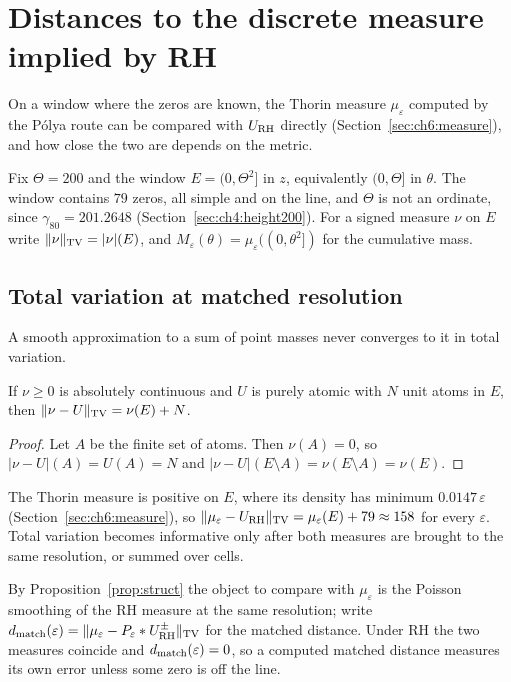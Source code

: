 \section{Distances to the discrete measure implied by RH}\label{ch:distances}

On a window where the zeros are known, the Thorin measure $\mu_\varepsilon$ computed by the P\'olya route can be compared with $U_{\mathrm{RH}}$ directly (Section~\ref{sec:ch6:measure}), and how close the two are depends on the metric.

Fix $\Theta=200$ and the window $E=(0,\Theta^2]$ in $z$, equivalently $(0,\Theta]$ in $\theta$. The window contains $79$ zeros, all simple and on the line, and $\Theta$ is not an ordinate, since $\gamma_{80}=201.2648$ (Section~\ref{sec:ch4:height200}). For a signed measure $\nu$ on $E$ write $\lVert \nu\rVert_{\mathrm{TV}}=|\nu|(E)$, and $M_\varepsilon(\theta)=\mu_\varepsilon((0,\theta^2])$ for the cumulative mass.

\subsection{Total variation at matched resolution}\label{sec:ch7:matched}

A smooth approximation to a sum of point masses never converges to it in total variation.

\begin{proposition}\label{prop:raw}
If $\nu\ge0$ is absolutely continuous and $U$ is purely atomic with $N$ unit atoms in $E$, then $\lVert \nu-U\rVert_{\mathrm{TV}}=\nu(E)+N$.
\end{proposition}

\begin{proof}
Let $A$ be the finite set of atoms. Then $\nu(A)=0$, so $|\nu-U|(A)=U(A)=N$ and $|\nu-U|(E\setminus A)=\nu(E\setminus A)=\nu(E)$.
\end{proof}

The Thorin measure is positive on $E$, where its density has minimum $0.0147\,\varepsilon$ (Section~\ref{sec:ch6:measure}), so $\lVert \mu_\varepsilon-U_{\mathrm{RH}}\rVert_{\mathrm{TV}}=\mu_\varepsilon(E)+79\approx158$ for every $\varepsilon$. Total variation becomes informative only after both measures are brought to the same resolution, or summed over cells.

By Proposition~\ref{prop:struct} the object to compare with $\mu_\varepsilon$ is the Poisson smoothing of the RH measure at the same resolution; write $d_{\rm match}(\varepsilon)=\lVert \mu_\varepsilon-P_\varepsilon*U^\pm_{\mathrm{RH}}\rVert_{\mathrm{TV}}$ for the matched distance. Under RH the two measures coincide and $d_{\rm match}(\varepsilon)=0$, so a computed matched distance measures its own error unless some zero is off the line.

